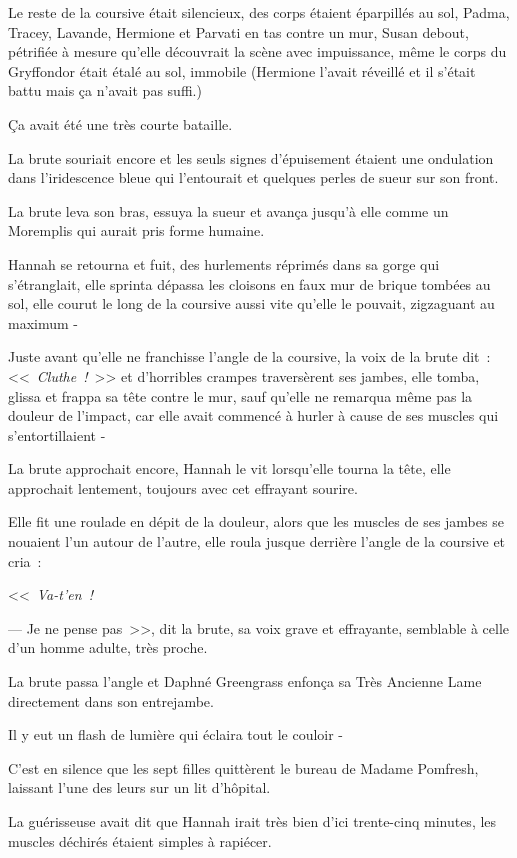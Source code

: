 Le reste de la coursive était silencieux, des corps étaient éparpillés au sol, Padma, Tracey, Lavande, Hermione et Parvati en tas contre un mur, Susan debout, pétrifiée à mesure qu'elle découvrait la scène avec impuissance, même le corps du Gryffondor était étalé au sol, immobile (Hermione l'avait réveillé et il s'était battu mais ça n'avait pas suffi.)

Ça avait été une très courte bataille.

La brute souriait encore et les seuls signes d'épuisement étaient une ondulation dans l'iridescence bleue qui l'entourait et quelques perles de sueur sur son front.

La brute leva son bras, essuya la sueur et avança jusqu'à elle comme un Moremplis qui aurait pris forme humaine.

Hannah se retourna et fuit, des hurlements réprimés dans sa gorge qui s'étranglait, elle sprinta dépassa les cloisons en faux mur de brique tombées au sol, elle courut le long de la coursive aussi vite qu'elle le pouvait, zigzaguant au maximum -

Juste avant qu'elle ne franchisse l'angle de la coursive, la voix de la brute dit~: <<~\emph{Cluthe~!}~>> et d'horribles crampes traversèrent ses jambes, elle tomba, glissa et frappa sa tête contre le mur, sauf qu'elle ne remarqua même pas la douleur de l'impact, car elle avait commencé à hurler à cause de ses muscles qui s'entortillaient -

La brute approchait encore, Hannah le vit lorsqu'elle tourna la tête, elle approchait lentement, toujours avec cet effrayant sourire.

Elle fit une roulade en dépit de la douleur, alors que les muscles de ses jambes se nouaient l'un autour de l'autre, elle roula jusque derrière l'angle de la coursive et cria~:

<<~\emph{Va-t'en~!}

--- Je ne pense pas~>>, dit la brute, sa voix grave et effrayante, semblable à celle d'un homme adulte, très proche.

La brute passa l'angle et Daphné Greengrass enfonça sa Très Ancienne Lame directement dans son entrejambe.

Il y eut un flash de lumière qui éclaira tout le couloir -

\later

C'est en silence que les sept filles quittèrent le bureau de Madame Pomfresh, laissant l'une des leurs sur un lit d'hôpital.

La guérisseuse avait dit que Hannah irait très bien d'ici trente-cinq minutes, les muscles déchirés étaient simples à rapiécer.


